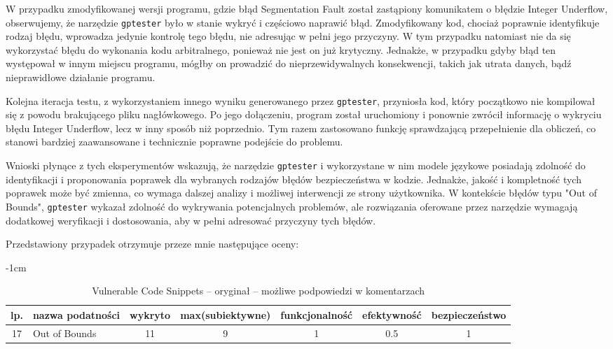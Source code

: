 W przypadku zmodyfikowanej wersji programu, gdzie błąd Segmentation Fault został zastąpiony komunikatem o błędzie Integer Underflow, obserwujemy, że narzędzie \texttt{gptester} było w stanie wykryć i częściowo naprawić błąd. Zmodyfikowany kod, chociaż poprawnie identyfikuje rodzaj błędu, wprowadza jedynie kontrolę tego błędu, nie adresując w pełni jego przyczyny. W tym przypadku natomiast nie da się wykorzystać błędu do wykonania kodu arbitralnego, ponieważ nie jest on już krytyczny. Jednakże, w przypadku gdyby błąd ten występował w innym miejscu programu, mógłby on prowadzić do nieprzewidywalnych konsekwencji, takich jak utrata danych, bądź nieprawidłowe działanie programu.

Kolejna iteracja testu, z wykorzystaniem innego wyniku generowanego przez \texttt{gptester}, przyniosła kod, który początkowo nie kompilował się z powodu brakującego pliku nagłówkowego. Po jego dołączeniu, program został uruchomiony i ponownie zwrócił informację o wykryciu błędu Integer Underflow, lecz w inny sposób niż poprzednio. Tym razem zastosowano funkcję sprawdzającą przepełnienie dla obliczeń, co stanowi bardziej zaawansowane i technicznie poprawne podejście do problemu.

Wnioski płynące z tych eksperymentów wskazują, że narzędzie \texttt{gptester} i wykorzystane w nim modele językowe posiadają zdolność do identyfikacji i proponowania poprawek dla wybranych rodzajów błędów bezpieczeństwa w kodzie. Jednakże, jakość i kompletność tych poprawek może być zmienna, co wymaga dalszej analizy i możliwej interwencji ze strony użytkownika. W kontekście błędów typu "Out of Bounds", \texttt{gptester} wykazał zdolność do wykrywania potencjalnych problemów, ale rozwiązania oferowane przez narzędzie wymagają dodatkowej weryfikacji i dostosowania, aby w pełni adresować przyczyny tych błędów. 

Przedstawiony przypadek otrzymuje przeze mnie następujące oceny:

\begin{table}[h]
  \centering
  \footnotesize
  \begin{adjustwidth}
  {-1cm}{}
  \caption{Vulnerable Code Snippets – oryginał – możliwe podpowiedzi w komentarzach}
  \begin{tabular}{|c|l|c|c|c|c|c|}
  \hline
  \textbf{lp.} & \textbf{nazwa podatności} & \textbf{wykryto} & \textbf{max(subiektywne)} & \textbf{funkcjonalność} & \textbf{efektywność} & \textbf{bezpieczeństwo} \\
  \hline
  17 & Out of Bounds & 11 & 9 & 1 & 0.5 & 1 \\
  \hline
  \end{tabular}
  \label{tab:my_label}
  \end{adjustwidth}
\end{table}

